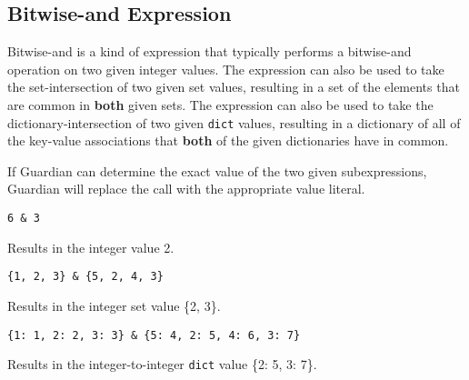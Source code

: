 
\subsection{Bitwise-and Expression}
{
	Bitwise-and is a kind of expression that typically performs
	a bitwise-and operation on two given integer values.
	The expression can also be used to take the set-intersection of two given
	set values, resulting in a set of the elements that are
	common in \textbf{both}
	given sets.
	The expression can also be used to take the
	dictionary-intersection of two given
	\texttt{dict} values, resulting in a dictionary of all of the key-value
	associations that \textbf{both} of the given dictionaries have in common.
	
	If Guardian can determine the exact value of the two given subexpressions,
	Guardian will replace the call with the appropriate value literal.
	
	\begin{itemize}
	{
		\item[] \texttt{6 \& 3}
		
			Results in the integer value 2.
		
		\item[] \texttt{\{1, 2, 3\} \& \{5, 2, 4, 3\}}
		
			Results in the integer set value \{2, 3\}.
		
		\item[] \texttt{\{1: 1, 2: 2, 3: 3\} \& \{5: 4, 2: 5, 4: 6, 3: 7\}}
		
			Results in the integer-to-integer \texttt{dict} value \{2: 5, 3: 7\}.
	}
	\end{itemize}
}

